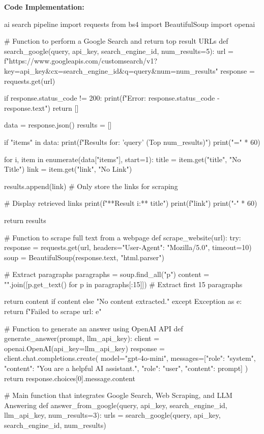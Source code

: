 \textbf{Code Implementation:}
\begin{codeonly}{ai search pipeline}
import requests
from bs4 import BeautifulSoup
import openai

# Function to perform a Google Search and return top result URLs
def search_google(query, api_key, search_engine_id, num_results=5):
    url = f"https://www.googleapis.com/customsearch/v1?key={api_key}&cx={search_engine_id}&q={query}&num={num_results}"
    response = requests.get(url)

    if response.status_code != 200:
        print(f"Error: {response.status_code} - {response.text}")
        return []

    data = response.json()
    results = []

    if "items" in data:
        print(f"\nSearch Results for: '{query}' (Top {num_results})")
        print("=" * 60)

        for i, item in enumerate(data["items"], start=1):
            title = item.get("title", "No Title")
            link = item.get("link", "No Link")

            results.append(link)  # Only store the links for scraping

            # Display retrieved links
            print(f"**Result {i}:** {title}")
            print(f"{link}")
            print("-" * 60)

    return results

# Function to scrape full text from a webpage
def scrape_website(url):
    try:
        response = requests.get(url, headers={"User-Agent": "Mozilla/5.0"}, timeout=10)
        soup = BeautifulSoup(response.text, "html.parser")

        # Extract paragraphs
        paragraphs = soup.find_all("p")
        content = "\n".join([p.get_text() for p in paragraphs[:15]])  # Extract first 15 paragraphs

        return content if content else "No content extracted."
    except Exception as e:
        return f"Failed to scrape {url}: {e}"

# Function to generate an answer using OpenAI API
def generate_answer(prompt, llm_api_key):
    client = openai.OpenAI(api_key=llm_api_key)
    response = client.chat.completions.create(
        model="gpt-4o-mini",
        messages=[{"role": "system", "content": "You are a helpful AI assistant."},
                  {"role": "user", "content": prompt}]
    )
    return response.choices[0].message.content

# Main function that integrates Google Search, Web Scraping, and LLM Answering
def answer_from_google(query, api_key, search_engine_id, llm_api_key, num_results=3):
    urls = search_google(query, api_key, search_engine_id, num_results)


\end{codeonly}
